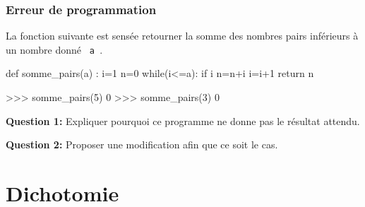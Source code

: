 \begin{frame}[fragile]
\frametitle{Erreur de programmation}

La fonction suivante est sensée retourner la somme des nombres pairs inférieurs à un nombre donné \verb? a ?.

\begin{minipage}{0.48\linewidth}
\begin{GrayBox}[0.85\textwidth]
\begin{verbatimtab}[3]
def somme_pairs(a) :
    i=1
    n=0
    while(i<=a):
        if i%
            n=n+i
        i=i+1
        return n
\end{verbatimtab}
\end{GrayBox}
\end{minipage}\hfill
\begin{minipage}{0.48\linewidth}
\begin{GrayBox}[0.85\textwidth]
\begin{verbatimtab}[3]
>>> somme_pairs(5)
0
>>> somme_pairs(3)
0
\end{verbatimtab}
\end{GrayBox}

\textbf{Question 1:} Expliquer pourquoi ce programme ne donne pas le résultat attendu.

\textbf{Question 2:} Proposer une modification afin que ce soit le cas.

\end{minipage}
\end{frame}

\section{Dichotomie}


